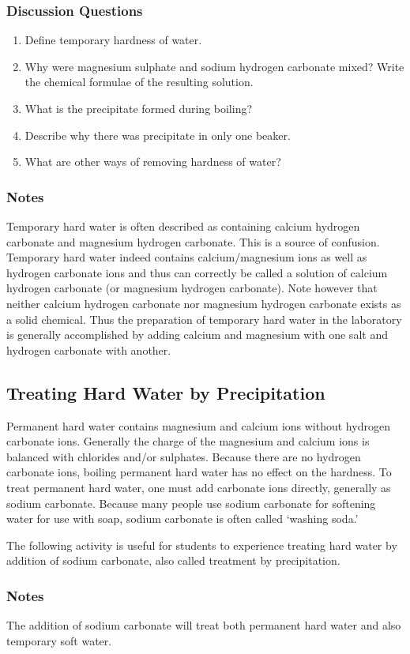 \subsubsection*{Discussion Questions}
\begin{enumerate}
\item{Define temporary hardness of water.}
\item{Why were magnesium sulphate and sodium hydrogen carbonate mixed? Write the chemical formulae of the resulting solution.}
\item{What is the precipitate formed during boiling?}
\item{Describe why there was precipitate in only one beaker.}
\item{What are other ways of removing hardness of water?}
\end{enumerate}

\subsubsection*{Notes}
Temporary hard water is often described as containing calcium hydrogen carbonate and magnesium hydrogen carbonate. This is a source of confusion. Temporary hard water indeed contains calcium/magnesium ions as well as hydrogen carbonate ions and thus can correctly be called a solution of calcium hydrogen carbonate (or magnesium hydrogen carbonate). Note however that neither calcium hydrogen carbonate nor magnesium hydrogen carbonate exists as a solid chemical. Thus the preparation of temporary hard water in the laboratory is generally accomplished by adding calcium and magnesium with one salt and hydrogen carbonate with another.

\subsection{Treating Hard Water by Precipitation}

Permanent hard water contains magnesium and calcium ions without hydrogen carbonate ions. Generally the charge of the magnesium and calcium ions is balanced with chlorides and/or sulphates. Because there are no hydrogen carbonate ions, boiling permanent hard water has no effect on the hardness. To treat permanent hard water, one must add carbonate ions directly, generally as sodium carbonate. Because many people use sodium carbonate for softening water for use with soap, sodium carbonate is often called `washing soda.'

The following activity is useful for students to experience treating hard water by addition of sodium carbonate, also called treatment by precipitation.

\subsubsection{Notes}
The addition of sodium carbonate will treat both permanent hard water and also temporary soft water.
